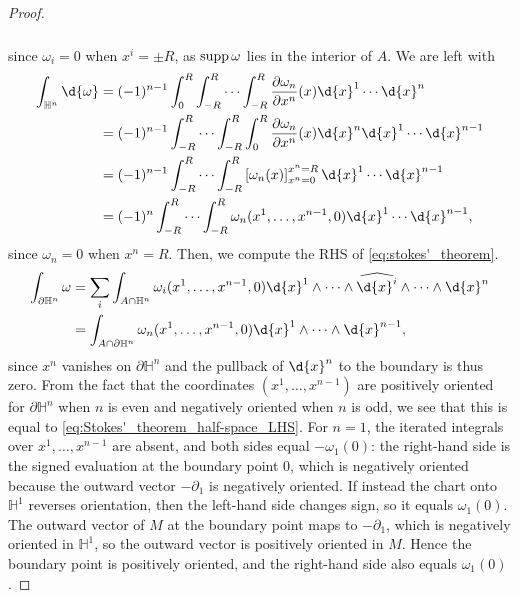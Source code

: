 \documentclass[a4paper,12pt]{article}
\begin{document}
\begin{proof}
\begin{align}
\begin{split}
        \end{split}
    \end{align}
    since $\omega_i = 0$ when $x^i = \pm R$, as $\operatorname{supp} \omega$ lies in the interior of $A$.
    We are left with
    \begin{align}\label{eq:Stokes'_theorem_half-space_LHS}
        \begin{split}
            \int_{\mathbb{H}^n} \d{\omega} &= (-1)^{n-1} \int_0^R \int_{-R}^R \cdots \int_{-R}^R \frac{\partial \omega_n}{\partial x^n} (x) \d{x}^1 \cdots \d{x}^n \\
            &= (-1)^{n-1} \int_{-R}^R \cdots \int_{-R}^R \int_0^R \frac{\partial \omega_n}{\partial x^n} (x) \d{x}^n \d{x}^1 \cdots \d{x}^{n-1} \\
            &= (-1)^{n-1} \int_{-R}^R \cdots \int_{-R}^R \left[\omega_n(x) \right]_{x^n = 0}^{x^n = R} \d{x}^1 \cdots \d{x}^{n-1} \\
            &= (-1)^n \int_{-R}^R \cdots \int_{-R}^R \omega_n (x^1, \ldots, x^{n-1}, 0) \d{x}^1 \cdots \d{x}^{n-1},
        \end{split}
    \end{align}
    since $\omega_n = 0$ when $x^n = R$.
    Then, we compute the RHS of \eqref{eq:stokes'_theorem}.
    \begin{align}
        \begin{split}
            \int_{\partial \mathbb{H}^n} \omega &= \sum_i \int_{A \cap \mathbb{H}^n} \omega_i (x^1, \ldots, x^{n-1}, 0) \d{x}^1 \wedge \cdots \wedge \widehat{\d{x}^i} \wedge \cdots \wedge \d{x}^n \\
            &= \int_{A \cap \partial \mathbb{H}^n} \omega_n(x^1, \ldots, x^{n-1}, 0) \d{x}^1 \wedge \cdots \wedge \d{x}^{n-1},
        \end{split}
    \end{align}
    since $x^n$ vanishes on $\partial \mathbb{H}^n$ and the pullback of $\d{x}^n$ to the boundary is thus zero.
    From the fact that the coordinates $(x^1, \ldots, x^{n-1})$ are positively oriented for $\partial \mathbb{H}^n$ when $n$ is even and negatively oriented when $n$ is odd, we see that this is equal to \eqref{eq:Stokes'_theorem_half-space_LHS}.
    For $n = 1$, the iterated integrals over $x^1, \ldots, x^{n-1}$ are absent, and both sides equal $-\omega_1(0)$: the right-hand side is the signed evaluation at the boundary point $0$, which is negatively oriented because the outward vector $-\partial_1$ is negatively oriented.
    If instead the chart onto $\mathbb{H}^1$ reverses orientation, then the left-hand side changes sign, so it equals $\omega_1(0)$.
    The outward vector of $M$ at the boundary point maps to $-\partial_1$, which is negatively oriented in $\mathbb{H}^1$, so the outward vector is positively oriented in $M$.
    Hence the boundary point is positively oriented, and the right-hand side also equals $\omega_1(0)$.


\end{proof}
\end{document}
